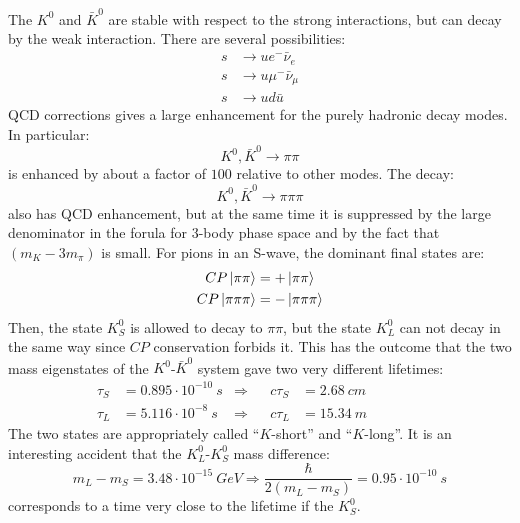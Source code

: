 \documentclass[../../main/main.tex]{subfiles}
\begin{document}
The \( K^0 \) and \( \bar{K}^0 \) are stable with respect to the strong interactions, but can decay by the weak interaction. There are several possibilities:
\begin{align}
	s	&\longrightarrow	u e^- \bar{\nu}_e	\\
	s	&\longrightarrow	u \mu^- \bar{\nu}_{\mu}	\\
	s	&\longrightarrow	u d \bar{u}
\end{align}
QCD corrections gives a large enhancement for the purely hadronic decay modes. In particular:
\begin{equation}
	K^0, \bar{K}^0 \longrightarrow \pi \pi
	\label{eq:}
\end{equation}
is enhanced by about a factor of \( 100 \) relative to other modes. The decay:
\begin{equation}
	K^0, \bar{K}^0 \longrightarrow \pi \pi \pi
	\label{eq:}
\end{equation}
also has QCD enhancement, but at the same time it is suppressed by the large denominator in the forula for 3-body phase space and by the fact that \( (m_K - 3m_{\pi}) \) is small. For pions in an S-wave, the dominant
final states are:
\begin{align}
	CP \ket{\pi\pi} &= + \ket{\pi\pi}	\\
	CP \ket{\pi\pi\pi} &= - \ket{\pi\pi\pi}
\end{align}
Then, the state \( K^0_S \) is allowed to decay to \( \pi \pi \), but the state \( K^0_L \) can not decay in the same way since \( CP \) conservation forbids it. This has the outcome that the two mass eigenstates of the \( K^0 \)-\( \bar{K}^0 \) system gave two very different lifetimes:
\begin{align}
	\tau_S	&=	0.895 \cdot 10^{-10} \ \si{s}	&\Longrightarrow&&	c\tau_S &= 2.68 \ \si{cm}	&&&&&	\\
	\tau_L	&=	5.116 \cdot 10^{-8}  \ \si{s}	&\Longrightarrow&&	c\tau_L &= 15.34 \ \si{m}	&&&&&
\end{align}
The two states are appropriately called ``\( K \)-short'' and ``\( K \)-long''. It is an interesting accident that the \( K^0_L \)-\( K^0_S \) mass difference:
\begin{equation}
	m_L - m_S
	=
	3.48 \cdot 10^{-15} \ \si{GeV}
	\Longrightarrow
	\frac{\hbar}{2(m_L - m_S)}
	=
	0.95 \cdot 10^{-10} \ \si{s}
	\label{eq:}
\end{equation}
corresponds to a time very close to the lifetime if the \( K^0_S \).
\end{document}
